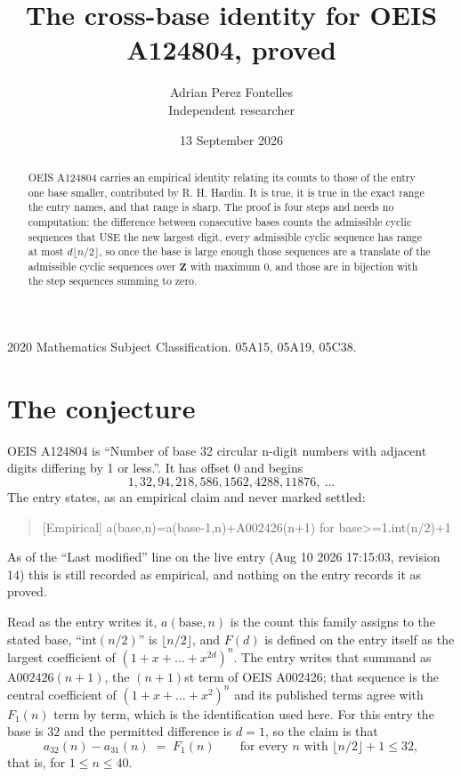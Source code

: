 \documentclass[11pt,a4paper]{article}
\title{The cross-base identity for OEIS A124804, proved}
\author{Adrian Perez Fontelles\\ \small Independent researcher}
\date{13 September 2026}
\theoremstyle{plain}
\theoremstyle{definition}
\begin{document}
\maketitle

\begin{abstract}
OEIS A124804 carries an empirical identity relating its counts to those of the entry one base
smaller, contributed by R. H. Hardin. It is true, it is true in the exact range the entry
names, and that range is sharp. The proof is four steps and needs no computation: the
difference between consecutive bases counts the admissible cyclic sequences that USE the new
largest digit, every admissible cyclic sequence has range at most $d\lfloor n/2\rfloor$, so
once the base is large enough those sequences are a translate of the admissible cyclic
sequences over $\mathbf{Z}$ with maximum $0$, and those are in bijection with the step
sequences summing to zero.
\end{abstract}

\noindent\small 2020 Mathematics Subject Classification. 05A15, 05A19, 05C38.\normalsize

\section{The conjecture}

OEIS A124804 is ``Number of base 32 circular n-digit numbers with adjacent digits differing by 1 or less.''. It has offset $0$ and begins
\[
1, 32, 94, 218, 586, 1562, 4288, 11876,\ \dots
\]
The entry states, as an empirical claim and never marked settled:
\begin{quote}
[Empirical] a(base,n)=a(base-1,n)+A002426(n+1) for base>=1.int(n/2)+1
\end{quote}
As of the ``Last modified'' line on the live entry (Aug 10 2026 17:15:03, revision 14)
this is still recorded as empirical, and nothing on the entry records it as proved.

Read as the entry writes it, $a(\mathrm{base},n)$ is the count this family assigns to the
stated base, ``$\mathrm{int}(n/2)$'' is $\lfloor n/2\rfloor$, and $F(d)$ is defined on the
entry itself as the largest coefficient of $(1+x+\dots+x^{2d})^{n}$. The entry writes that summand as $\mathrm{A002426}(n+1)$, the $(n+1)$st term of OEIS A002426; that sequence is the central coefficient of $(1+x+\dots+x^{2})^{n}$ and its published terms agree with $F_{1}(n)$ term by term, which is the identification used here. For this entry
the base is $32$ and the permitted difference is $d=1$, so the claim is that
\[
a_{32}(n)-a_{31}(n)\;=\;F_{1}(n)
\qquad\text{for every } n \text{ with } \lfloor n/2\rfloor+1\le32,
\]
that is, for $1\le n\le40$.
\end{document}
